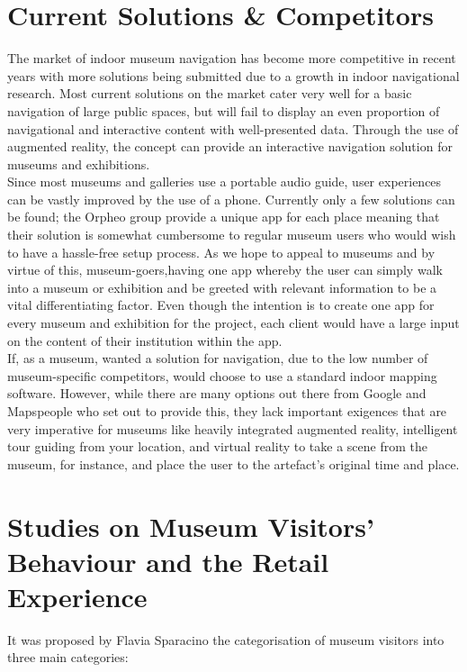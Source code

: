 \section{Current Solutions \& Competitors}
The market of indoor museum navigation has become more competitive in recent years with more solutions being submitted due to a growth in indoor navigational research. Most current solutions on the market cater very well for a basic navigation of large public spaces, but will fail to display an even proportion of navigational and interactive content with well-presented data. Through the use of augmented reality, the concept can provide an interactive navigation solution for museums and exhibitions.\\
 
Since most museums and galleries use a portable audio guide, user experiences can be vastly improved by the use of a phone. Currently only a few solutions can be found; the Orpheo group \cite{orpheo} provide a unique app for each place meaning that their solution is somewhat cumbersome to regular museum users who would wish to have a hassle-free setup process. As we hope to appeal to museums and by virtue of this, museum-goers,having one app whereby the user can simply walk into a museum or exhibition and be greeted with relevant information to be a vital differentiating factor.\cite{microsoft} Even though the intention is to create one app for every museum and exhibition for the project, each client would have a large input on the content of their institution within the app.\\

If, as a museum, wanted a solution for navigation, due to the low number of museum-specific competitors, would choose to use a standard indoor mapping software. \cite{engadget} However, while there are many options out there from Google and Mapspeople \cite{mapspeople} who set out to provide this, they lack important exigences that are very imperative for museums like heavily integrated augmented reality, intelligent tour guiding from your location, and virtual reality to take a scene from the museum, for instance, and place the user to the artefact's original time and place.

\section{Studies on Museum Visitors' Behaviour and the Retail Experience}
It was proposed by Flavia Sparacino \cite{sparacino} the categorisation of museum visitors into three main categories: 

